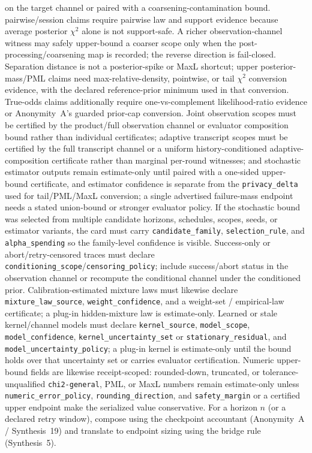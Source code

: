 \documentclass[11pt]{article}
\begin{document}
on the target channel or paired with a coarsening-contamination bound. pairwise/session claims require pairwise law and support evidence because average posterior $\chi^2$ alone is not support-safe. A richer observation-channel witness may safely upper-bound a coarser scope only when the post-processing/coarsening map is recorded; the reverse direction is fail-closed. Separation distance is not a posterior-spike or MaxL shortcut; upper posterior-mass/PML claims need max-relative-density, pointwise, or tail $\chi^2$ conversion evidence, with the declared reference-prior minimum used in that conversion. True-odds claims additionally require one-vs-complement likelihood-ratio evidence or Anonymity~A's guarded prior-cap conversion. Joint observation scopes must be certified by the product/full observation channel or evaluator composition bound rather than individual certificates; adaptive transcript scopes must be certified by the full transcript channel or a uniform history-conditioned adaptive-composition certificate rather than marginal per-round witnesses; and stochastic estimator outputs remain estimate-only until paired with a one-sided upper-bound certificate, and estimator confidence is separate from the \nolinkurl{privacy_delta} used for tail/PML/MaxL conversion; a single advertised failure-mass endpoint needs a stated union-bound or stronger evaluator policy. If the stochastic bound was selected from multiple candidate horizons, schedules, scopes, seeds, or estimator variants, the card must carry \nolinkurl{candidate_family}, \nolinkurl{selection_rule}, and \nolinkurl{alpha_spending} so the family-level confidence is visible. Success-only or abort/retry-censored traces must declare \texttt{conditioning\_scope}/\texttt{censoring\_policy}; include success/abort status in the observation channel or recompute the conditional channel under the conditioned prior. Calibration-estimated mixture laws must likewise declare \nolinkurl{mixture_law_source}, \nolinkurl{weight_confidence}, and a weight-set / empirical-law certificate; a plug-in hidden-mixture law is estimate-only. Learned or stale kernel/channel models must declare \nolinkurl{kernel_source}, \nolinkurl{model_scope}, \nolinkurl{model_confidence}, \nolinkurl{kernel_uncertainty_set} or \nolinkurl{stationary_residual}, and \nolinkurl{model_uncertainty_policy}; a plug-in kernel is estimate-only until the bound holds over that uncertainty set or carries evaluator certification. Numeric upper-bound fields are likewise receipt-scoped: rounded-down, truncated, or tolerance-unqualified \texttt{chi2-general}, PML, or MaxL numbers remain estimate-only unless \nolinkurl{numeric_error_policy}, \nolinkurl{rounding_direction}, and \nolinkurl{safety_margin} or a certified upper endpoint make the serialized value conservative.
For a horizon $n$ (or a declared retry window), compose using the checkpoint accountant (Anonymity~A / Synthesis~19) and translate to endpoint sizing using the bridge rule (Synthesis~5).\cite{series:spectral2budget,series:oddsinflation,series:receiptacct,series:endpointbridge}
\end{document}
